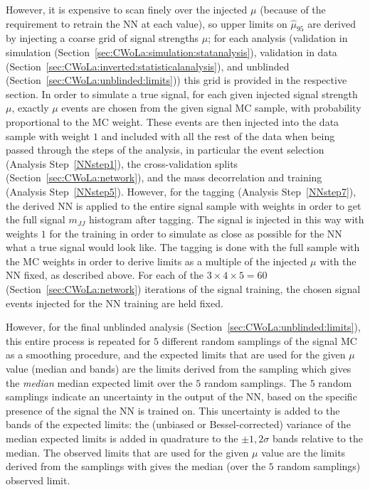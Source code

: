 However, it is expensive to scan finely over the injected $\mu$ (because of the requirement to retrain the NN at each value), so upper limits on $\hat{\mu}_{95}$ are derived by injecting a coarse grid of signal strengths $\mu$; for each analysis (validation in simulation (Section~\ref{sec:CWoLa:simulation:statanalysis}), validation in data (Section~\ref{sec:CWoLa:inverted:statisticalanalysis}), and unblinded (Section~\ref{sec:CWoLa:unblinded:limits})) this grid is provided in the respective section.
In order to simulate a true signal, for each given injected signal strength $\mu$, exactly $\mu$ events are chosen from the given signal MC sample, with probability proportional to the MC weight.
These events are then injected into the data sample with weight $1$ and included with all the rest of the data when being passed through the steps of the analysis, in particular the event selection (Analysis Step~\ref{NNstep1}), the cross-validation splits (Section~\ref{sec:CWoLa:network}), and the mass decorrelation and training (Analysis Step~\ref{NNstep5}).
However, for the tagging (Analysis Step~\ref{NNstep7}), the derived NN is applied to the entire signal sample with weights in order to get the full signal $m_{JJ}$ histogram after tagging.
The signal is injected in this way with weights $1$ for the training in order to simulate as close as possible for the NN what a true signal would look like.
The tagging is done with the full sample with the MC weights in order to derive limits as a multiple of the injected $\mu$ with the NN fixed, as described above.
For each of the $3\times4\times5=60$ (Section~\ref{sec:CWoLa:network}) iterations of the signal training, the chosen signal events injected for the NN training are held fixed.

However, for the final unblinded analysis (Section~\ref{sec:CWoLa:unblinded:limits}), this entire process is repeated for $5$ different random samplings of the signal MC as a smoothing procedure, and the expected limits that are used for the given $\mu$ value (median and bands) are the limits derived from the sampling which gives the \textit{median} median expected limit over the $5$ random samplings.
The $5$ random samplings indicate an uncertainty in the output of the NN, based on the specific presence of the signal the NN is trained on.
This uncertainty is added to the bands of the expected limits:
the (unbiased or Bessel-corrected) variance of the median expected limits is added in quadrature to the $\pm 1,2\sigma$ bands relative to the median.
The observed limits that are used for the given $\mu$ value are the limits derived from the samplings with gives the median (over the $5$ random samplings) observed limit.

